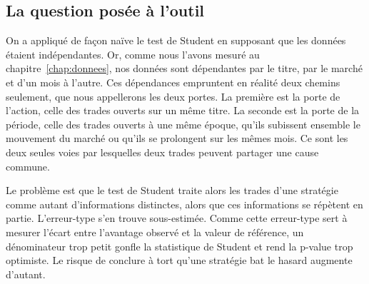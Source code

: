 \subsection{La question posée à l'outil}
On a appliqué de façon naïve le test de Student en supposant que
les données étaient indépendantes. Or, comme nous l'avons mesuré
au chapitre~\ref{chap:donnees}, nos données sont dépendantes par le titre,
par le marché et d'un mois à l'autre.
Ces dépendances empruntent en réalité deux chemins seulement, que nous
appellerons les deux portes. La première est la porte de l'action, celle des
trades ouverts sur un même titre. La seconde est la porte de la période,
celle des trades ouverts à une même époque, qu'ils subissent ensemble le
mouvement du marché ou qu'ils se prolongent sur les mêmes mois. Ce sont les
deux seules voies par lesquelles deux trades peuvent partager une cause
commune.

Le problème est que le test de Student traite alors les trades d'une stratégie
comme autant d'informations distinctes, alors que ces informations se
répètent en partie. L'erreur-type s'en trouve sous-estimée. Comme cette
erreur-type sert à mesurer l'écart entre l'avantage observé et la valeur de
référence, un dénominateur trop petit gonfle la statistique de Student et
rend la p-value trop optimiste. Le risque de conclure à tort qu'une stratégie
bat le hasard augmente d'autant.

